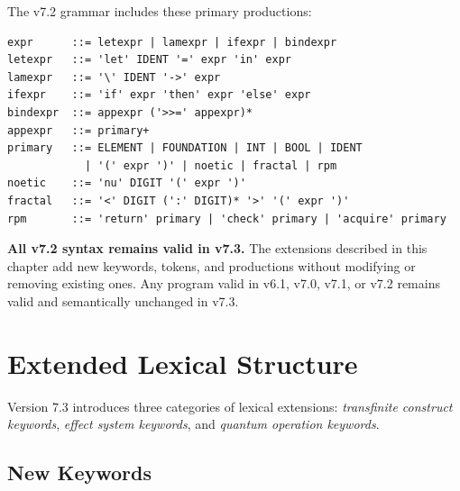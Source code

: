 \begin{definition}
\label{def:v72-grammar-summary}
The v7.2 grammar includes these primary productions:
\begin{lstlisting}[style=bnf,caption={v7.2 Core Grammar (Summary)}]
expr      ::= letexpr | lamexpr | ifexpr | bindexpr
letexpr   ::= 'let' IDENT '=' expr 'in' expr
lamexpr   ::= '\' IDENT '->' expr
ifexpr    ::= 'if' expr 'then' expr 'else' expr
bindexpr  ::= appexpr ('>>=' appexpr)*
appexpr   ::= primary+
primary   ::= ELEMENT | FOUNDATION | INT | BOOL | IDENT
            | '(' expr ')' | noetic | fractal | rpm
noetic    ::= 'nu' DIGIT '(' expr ')'
fractal   ::= '<' DIGIT (':' DIGIT)* '>' '(' expr ')'
rpm       ::= 'return' primary | 'check' primary | 'acquire' primary
\end{lstlisting}
\end{definition}

\begin{remark}
\label{rem:backward-compat}
\textbf{All v7.2 syntax remains valid in v7.3.} The extensions described in this chapter add new keywords, tokens, and productions without modifying or removing existing ones. Any program valid in v6.1, v7.0, v7.1, or v7.2 remains valid and semantically unchanged in v7.3.
\end{remark}

\section{Extended Lexical Structure}
\label{sec:extended-lexical}

Version 7.3 introduces three categories of lexical extensions: \emph{transfinite construct keywords}, \emph{effect system keywords}, and \emph{quantum operation keywords}.

\subsection{New Keywords}
\label{subsec:new-keywords}

